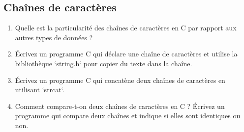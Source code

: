 \subsection{Chaînes de caractères}
\begin{enumerate}
	\item Quelle est la particularité des chaînes de caractères en C par rapport aux autres types de données ?
	\item Écrivez un programme C qui déclare une chaîne de caractères et utilise la bibliothèque `string.h` pour copier du texte dans la chaîne.
		
			
			
			
	
	\item Écrivez un programme C qui concatène deux chaînes de caractères en utilisant `strcat`.
		
			
			
			
	
	\item Comment compare-t-on deux chaînes de caractères en C ? Écrivez un programme qui compare deux chaînes et indique si elles sont identiques ou non.
		
			
			
			
\end{enumerate}

